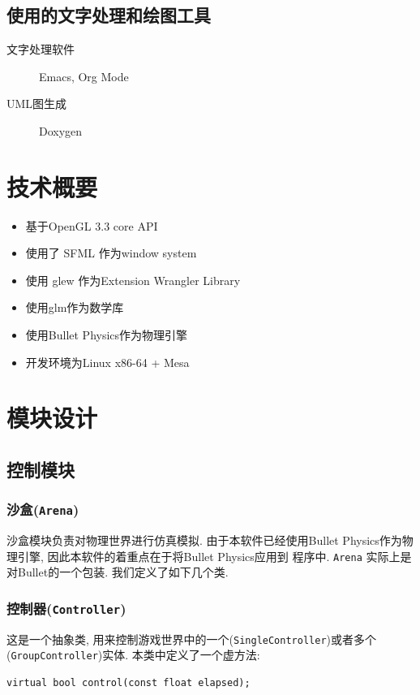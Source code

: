 \documentclass[11pt]{article}
\begin{document}
\subsection{使用的文字处理和绘图工具}
\label{sec-1-4}
\begin{description}
\item[{文字处理软件}] Emacs, Org Mode
\item[{UML图生成}] Doxygen
\end{description}
\section{技术概要}
\label{sec-2}
\begin{itemize}
\item 基于OpenGL 3.3 core API
\item 使用了 SFML 作为window system
\item 使用 glew 作为Extension Wrangler Library
\item 使用glm作为数学库
\item 使用Bullet Physics作为物理引擎
\item 开发环境为Linux x86-64 + Mesa
\end{itemize}
\section{模块设计}
\label{sec-3}
\subsection{控制模块}
\label{sec-3-1}
\subsubsection{沙盒(\texttt{Arena})}
\label{sec-3-1-1}
沙盒模块负责对物理世界进行仿真模拟. 由于本软件已经使用Bullet
Physics作为物理引擎, 因此本软件的着重点在于将Bullet Physics应用到
程序中. \texttt{Arena} 实际上是对Bullet的一个包装. 我们定义了如下几个类.
\subsubsection{控制器(\texttt{Controller})}
\label{sec-3-1-2}
这是一个抽象类, 用来控制游戏世界中的一个(\texttt{SingleController})或者多个
(\texttt{GroupController})实体. 本类中定义了一个虚方法:

\begin{verbatim}
virtual bool control(const float elapsed);
\end{verbatim}
\end{document}
